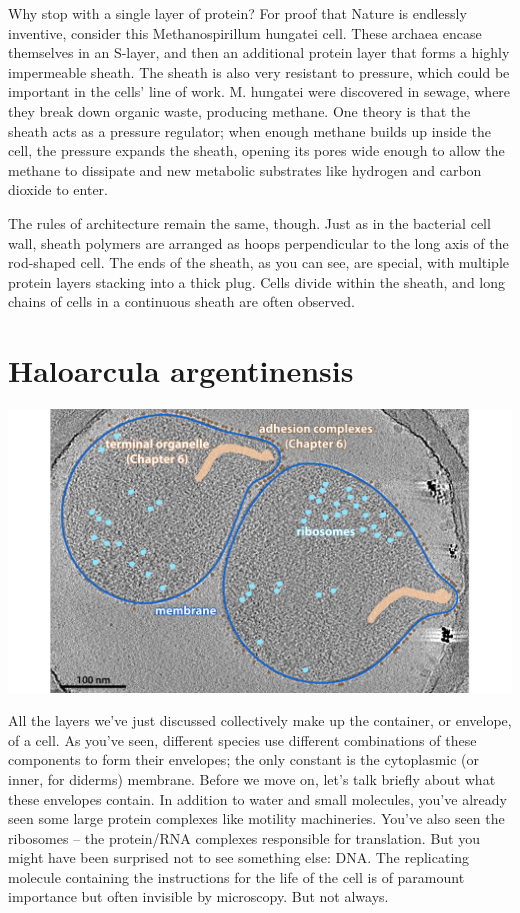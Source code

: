 \documentclass[]{tufte-book}
\begin{document}
Why stop with a single layer of protein? For proof that Nature is
endlessly inventive, consider this Methanospirillum hungatei cell. These
archaea encase themselves in an S-layer, and then an additional protein
layer that forms a highly impermeable sheath. The sheath is also very
resistant to pressure, which could be important in the cells' line of
work. M. hungatei were discovered in sewage, where they break down
organic waste, producing methane. One theory is that the sheath acts as
a pressure regulator; when enough methane builds up inside the cell, the
pressure expands the sheath, opening its pores wide enough to allow the
methane to dissipate and new metabolic substrates like hydrogen and
carbon dioxide to enter.

The rules of architecture remain the same, though. Just as in the
bacterial cell wall, sheath polymers are arranged as hoops perpendicular
to the long axis of the rod-shaped cell. The ends of the sheath, as you
can see, are special, with multiple protein layers stacking into a thick
plug. Cells divide within the sheath, and long chains of cells in a
continuous sheath are often observed.

\section{Haloarcula argentinensis}\label{haloarcula-argentinensis}

\includegraphics{img/02_static/2_1_Mgenitalium}

All the layers we've just discussed collectively make up the container,
or envelope, of a cell. As you've seen, different species use different
combinations of these components to form their envelopes; the only
constant is the cytoplasmic (or inner, for diderms) membrane. Before we
move on, let's talk briefly about what these envelopes contain. In
addition to water and small molecules, you've already seen some large
protein complexes like motility machineries. You've also seen the
ribosomes -- the protein/RNA complexes responsible for translation. But
you might have been surprised not to see something else: DNA. The
replicating molecule containing the instructions for the life of the
cell is of paramount importance but often invisible by microscopy. But
not always.
\end{document}
